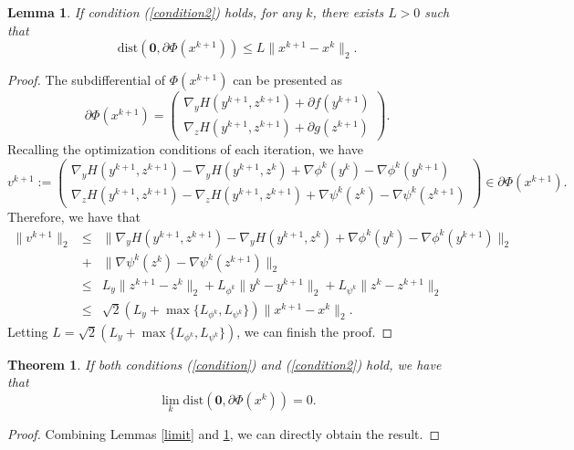 \documentclass[12pt]{article}
\newtheorem{theorem}{Theorem}
\newtheorem{proof}{Proof}
\newtheorem{lemma}{Lemma}
\begin{document}
\begin{lemma}\label{relative}
If condition (\ref{condition2}) holds, for any $k$, there exists $L>0$ such that
\begin{equation}
    \textrm{dist}(\textbf{0},\partial \Phi(x^{k+1}))\leq L\|x^{k+1}-x^k\|_2.
\end{equation}
\end{lemma}
\begin{proof}
The subdifferential of $\Phi(x^{k+1})$ can be presented as
\begin{equation}
    \partial\Phi(x^{k+1})=\left(\begin{array}{c}
                            \nabla_{y}H(y^{k+1},z^{k+1})+\partial f(y^{k+1}) \\
                             \nabla_{z}H(y^{k+1},z^{k+1})+\partial g(z^{k+1})
                          \end{array}\right).
\end{equation}
Recalling the optimization conditions of each iteration, we have
\begin{equation}
   v^{k+1}:= \left(\begin{array}{c}
                            \nabla_{y}H(y^{k+1},z^{k+1})-\nabla_{y}H(y^{k+1},z^{k})+\nabla\phi^{k}(y^{k})-\nabla\phi^{k}(y^{k+1}) \\
                             \nabla_{z}H(y^{k+1},z^{k+1})-\nabla_{z}H(y^{k+1},z^{k+1})+\nabla\psi^{k}(z^{k})-\nabla\psi^{k}(z^{k+1})
                          \end{array}\right)\in \partial\Phi(x^{k+1}).
\end{equation}
Therefore, we have that
\begin{eqnarray}
\|v^{k+1}\|_2&\leq& \|\nabla_{y}H(y^{k+1},z^{k+1})-\nabla_{y}H(y^{k+1},z^{k})+\nabla\phi^{k}(y^{k})-\nabla\phi^{k}(y^{k+1})\|_2\nonumber\\
&+&\|\nabla\psi^{k}(z^{k})-\nabla\psi^{k}(z^{k+1})\|_2\nonumber\\
&\leq&L_y\|z^{k+1}-z^{k}\|_2+L_{\phi^{k}}\|y^{k}-y^{k+1}\|_2+L_{\psi^{k}}\|z^{k}-z^{k+1}\|_2\nonumber\\
&\leq&\sqrt{2}(L_y+\max\{L_{\phi^{k}},L_{\psi^{k}}\})\|x^{k+1}-x^k\|_2.
\end{eqnarray}
Letting $L=\sqrt{2}(L_y+\max\{L_{\phi^{k}},L_{\psi^{k}}\})$, we can finish the proof.
\end{proof}
\begin{theorem}
If  both conditions (\ref{condition}) and (\ref{condition2}) hold, we have that
\begin{equation}
    \lim_{k}\textrm{dist}(\textbf{0},\partial \Phi(x^{k}))=0.
\end{equation}
\end{theorem}
\begin{proof}
Combining Lemmas \ref{limit} and \ref{relative}, we can directly obtain the result.
\end{proof}
\end{document}
